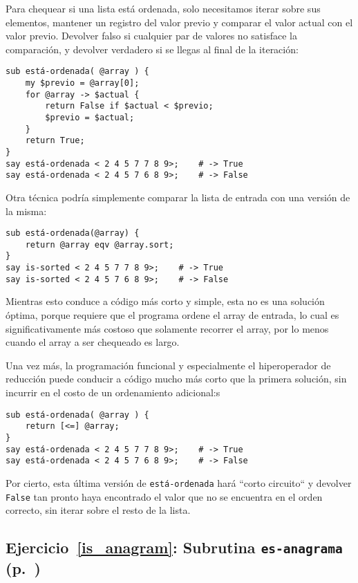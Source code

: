 Para chequear si una lista está ordenada, solo necesitamos iterar
sobre sus elementos, mantener un registro del valor previo y 
comparar el valor actual con el valor previo. Devolver falso
si cualquier par de valores no satisface la comparación, 
y devolver verdadero si se llegas al final de la iteración:

\begin{verbatim}
sub está-ordenada( @array ) {
    my $previo = @array[0];
    for @array -> $actual {
        return False if $actual < $previo;
        $previo = $actual;
    }
    return True;
}
say está-ordenada < 2 4 5 7 7 8 9>;    # -> True
say está-ordenada < 2 4 5 7 6 8 9>;    # -> False
\end{verbatim}

Otra técnica podría simplemente comparar la lista de
entrada con una versión de la misma:

\begin{verbatim}
sub está-ordenada(@array) {
    return @array eqv @array.sort;
}
say is-sorted < 2 4 5 7 7 8 9>;    # -> True
say is-sorted < 2 4 5 7 6 8 9>;    # -> False
\end{verbatim}

Mientras esto conduce a código más corto y simple,
esta no es una solución óptima, porque requiere que 
el programa ordene el array de entrada, lo cual es
significativamente más costoso que solamente recorrer
el array, por lo menos cuando el array a ser chequeado
es largo.

Una vez más, la programación funcional y especialmente 
el hiperoperador de reducción puede conducir a código
mucho más corto que la primera solución, sin incurrir 
en el costo de un ordenamiento adicional:s

\begin{verbatim}
sub está-ordenada( @array ) {
    return [<=] @array;
}
say está-ordenada < 2 4 5 7 7 8 9>;    # -> True
say está-ordenada < 2 4 5 7 6 8 9>;    # -> False
\end{verbatim}

Por cierto, esta última versión de {\tt está-ordenada} 
hará ``corto circuito`` y devolver \verb|False| tan pronto
haya encontrado el valor que no se encuentra en el orden
correcto, sin iterar sobre el resto de la lista.

\subsection{Ejercicio~\ref{is_anagram}: Subrutina {\tt es-anagrama} (p.~\pageref{is_anagram})}
\label{sol_is_anagram}

